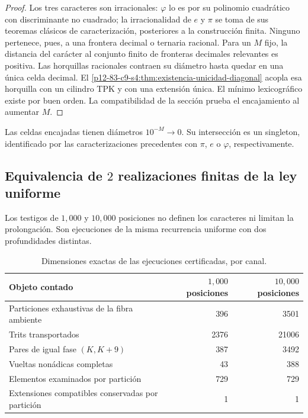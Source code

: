 \begin{proof}
Los tres caracteres son irracionales: \(\varphi\) lo es por su polinomio
cuadrático con discriminante no cuadrado; la irracionalidad de \(e\) y
\(\pi\) se toma de sus teoremas clásicos de caracterización, posteriores a
la construcción finita. Ninguno pertenece, pues, a una frontera decimal o
ternaria racional. Para un \(M\) fijo, la distancia del carácter al conjunto
finito de fronteras decimales relevantes es positiva. Las horquillas
racionales contraen su diámetro hasta quedar en una única celda decimal.
El \cref{p12-83-c9-s4:thm:existencia-unicidad-diagonal} acopla esa horquilla con un
cilindro TPK y con una extensión única. El mínimo lexicográfico existe por
buen orden. La compatibilidad de la sección prueba el encajamiento al
aumentar \(M\).
\end{proof}

\begin{corollary}
Las celdas encajadas tienen diámetros \(10^{-M}\to0\). Su intersección es
un singleton, identificado por las caracterizaciones precedentes con
\(\pi\), \(e\) o \(\varphi\), respectivamente.
\end{corollary}

\subsection{Equivalencia de \(2\) realizaciones finitas de la ley uniforme}

Los testigos de \(1,000\) y \(10,000\) posiciones no definen los
caracteres ni limitan la prolongación. Son ejecuciones de la misma recurrencia
uniforme con dos profundidades distintas.

\begin{table}[htbp]
\centering
\caption{Dimensiones exactas de las ejecuciones certificadas, por canal.}
\label{p12-83-c9-s4:tab:dimensiones-ejecuciones-1000-10000}
\begin{tabular}{lrr}
\toprule
Objeto contado & \(1,000\) posiciones & \(10,000\) posiciones\\
\midrule
Particiones exhaustivas de la fibra ambiente & 396 & 3501\\
Trits transportados & 2376 & 21006\\
Pares de igual fase \((K,K+9)\) & 387 & 3492\\
Vueltas nonádicas completas & 43 & 388\\
Elementos examinados por partición & 729 & 729\\
Extensiones compatibles conservadas por partición & 1 & 1\\
\bottomrule
\end{tabular}
\end{table}

